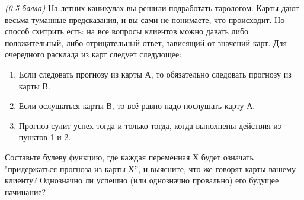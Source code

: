 \question
\textit{(0.5 балла)} На летних каникулах вы решили подработать тарологом. Карты дают весьма туманные предсказания, и вы сами не понимаете, что происходит. Но способ схитрить есть: на все вопросы клиентов можно давать либо положительный, либо отрицательный ответ, зависящий от значений карт. Для очередного расклада из карт следует следующее:

\begin{enumerate}
\item Если следовать прогнозу из карты А, то обязательно следовать прогнозу из карты В.
\item Если ослушаться карты В, то всё равно надо послушать карту А.
\item Прогноз сулит успех тогда и только тогда, когда выполнены действия из пунктов 1 и 2.
\end{enumerate}

Составьте булеву функцию, где каждая переменная Х будет означать "придержаться прогноза из карты Х”, и выясните, что же говорят карты вашему клиенту? Однозначно ли успешно (или однозначно провально) его будущее начинание?